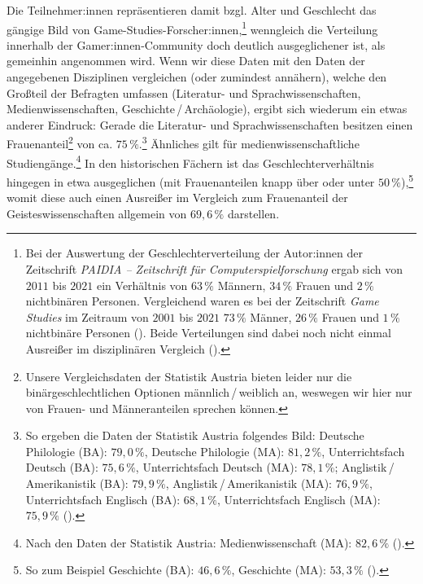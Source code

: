 \documentclass{scrartcl}
\begin{document}
Die Teilnehmer:innen repräsentieren damit bzgl. Alter und Geschlecht das gängige Bild von Game-Studies-Forscher:innen,\footnote{Bei der Auswertung der Geschlechterverteilung der Autor:innen der Zeitschrift \textit{PAIDIA -- Zeitschrift für Computerspielforschung} ergab sich von $2011$ bis $2021$ ein Verhältnis von $63\,\%$ Männern, $34\,\%$ Frauen und $2\,\%$ nichtbinären Personen. Vergleichend waren es bei der Zeitschrift \textit{Game Studies} im Zeitraum von $2001$ bis $2021$ $73\,\%$ Männer, $26\,\%$ Frauen und $1\,\%$ nichtbinäre Personen (\autocite[vgl.][]{unterhuber_offenes_2021}). Beide Verteilungen sind dabei noch nicht einmal Ausreißer im disziplinären Vergleich (\autocite[vgl.][]{west_role_2013}).} wenngleich die Verteilung innerhalb der Gamer:innen-Community doch deutlich ausgeglichener ist, als gemeinhin angenommen wird.\autocite[Vgl. hierzu etwa][S.~13]{rother_spielraume_2025}
Wenn wir diese Daten mit den Daten der angegebenen Disziplinen vergleichen (oder zumindest annähern), welche den Großteil der Befragten umfassen (Literatur- und Sprachwissenschaften, Medienwissenschaften, Geschichte\,/\,Archäologie), ergibt sich wiederum ein etwas anderer Eindruck:
Gerade die Literatur- und Sprachwissenschaften besitzen einen Frauenanteil\footnote{Unsere Vergleichsdaten der Statistik Austria bieten leider nur die binärgeschlechtlichen Optionen männlich\,/\,weiblich an, weswegen wir hier nur von Frauen- und Männeranteilen sprechen können.} von ca. $75\,\%$.\footnote{So ergeben die Daten der Statistik Austria folgendes Bild: Deutsche Philologie (BA): $79,0\,\%$, Deutsche Philologie (MA): $81,2\,\%$, Unterrichtsfach Deutsch (BA): $75,6\,\%$, Unterrichtsfach Deutsch (MA): $78,1\,\%$; Anglistik\,/\,Amerikanistik (BA): $79,9\,\%$, Anglistik\,/\,Amerikanistik (MA): $76,9\,\%$, Unterrichtsfach Englisch (BA): $68,1\,\%$, Unterrichtsfach Englisch (MA): $75,9\,\%$ (\autocite[vgl.][]{statistik_austria_studierende_2025}).}
Ähnliches gilt für medienwissenschaftliche Studiengänge.\footnote{Nach den Daten der Statistik Austria: Medienwissenschaft (MA): $82,6\,\%$ (\autocite[vgl.][]{statistik_austria_studierende_2025}).}
In den historischen Fächern ist das Geschlechterverhältnis hingegen in etwa ausgeglichen (mit Frauenanteilen knapp über oder unter $50\,\%$),\footnote{So zum Beispiel Geschichte (BA): $46,6\,\%$, Geschichte (MA): $53,3\,\%$ (\autocite[vgl.][]{statistik_austria_studierende_2025}).} womit diese auch einen Ausreißer im Vergleich zum Frauenanteil der Geisteswissenschaften allgemein von $69,6\,\%$ darstellen.\autocite[Vgl. wiederum die Daten der][]{statistik_austria_studierende_2025}
\end{document}
